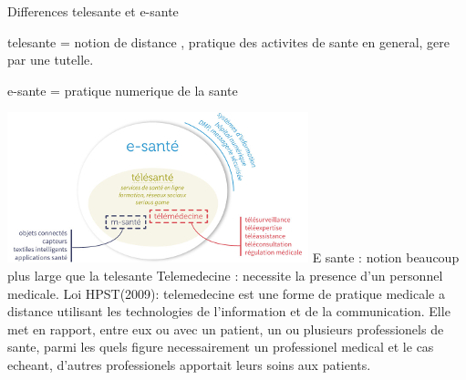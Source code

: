 \documentclass{article}
\begin{document}
Differences telesante et e-sante

telesante = notion de distance , pratique des activites de sante en general, gere par une tutelle.

e-sante = pratique numerique de la sante

\includegraphics{img/circle.jpg}
\newline\newline
E sante : notion beaucoup plus large que la telesante
\newline
Telemedecine : necessite la presence d'un personnel medicale.
\newline\newline
Loi HPST(2009): telemedecine est une forme de pratique medicale a distance utilisant les technologies de l'information et de la communication. Elle met en rapport, entre eux ou avec un patient, un ou plusieurs professionels de sante, parmi les quels figure necessairement un professionel medical et le cas echeant, d'autres professionels apportait leurs soins aux patients.
\end{document}
